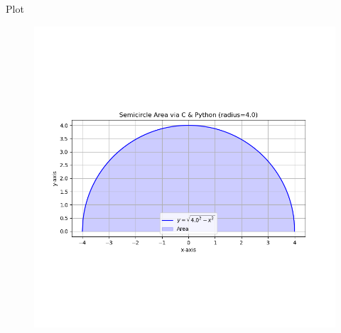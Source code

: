 \documentclass{beamer}
\begin{document}
\begin{frame}{Plot}
\begin{figure}[H]
	\centering
	\includegraphics[width=1\linewidth]{../figs/semicircle_plot_from_c}
\end{figure}

\end{frame}
\end{document}
